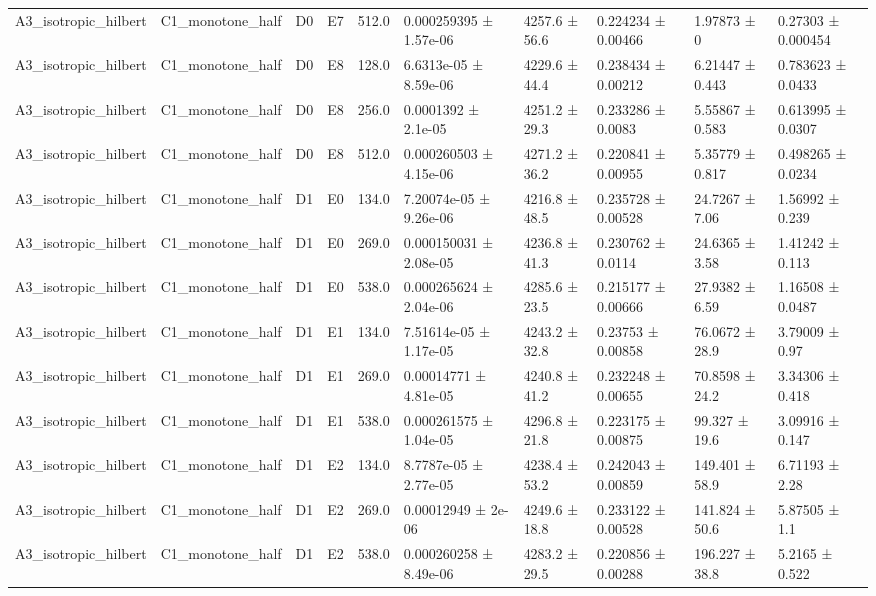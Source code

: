 \begin{table}
\begin{tabular}{llllllllll}
A3\_isotropic\_hilbert & C1\_monotone\_half & D0 & E7 & 512.0 & 0.000259395 ± 1.57e-06 & 4257.6 ± 56.6 & 0.224234 ± 0.00466 & 1.97873 ± 0 & 0.27303 ± 0.000454 \\
A3\_isotropic\_hilbert & C1\_monotone\_half & D0 & E8 & 128.0 & 6.6313e-05 ± 8.59e-06 & 4229.6 ± 44.4 & 0.238434 ± 0.00212 & 6.21447 ± 0.443 & 0.783623 ± 0.0433 \\
A3\_isotropic\_hilbert & C1\_monotone\_half & D0 & E8 & 256.0 & 0.0001392 ± 2.1e-05 & 4251.2 ± 29.3 & 0.233286 ± 0.0083 & 5.55867 ± 0.583 & 0.613995 ± 0.0307 \\
A3\_isotropic\_hilbert & C1\_monotone\_half & D0 & E8 & 512.0 & 0.000260503 ± 4.15e-06 & 4271.2 ± 36.2 & 0.220841 ± 0.00955 & 5.35779 ± 0.817 & 0.498265 ± 0.0234 \\
A3\_isotropic\_hilbert & C1\_monotone\_half & D1 & E0 & 134.0 & 7.20074e-05 ± 9.26e-06 & 4216.8 ± 48.5 & 0.235728 ± 0.00528 & 24.7267 ± 7.06 & 1.56992 ± 0.239 \\
A3\_isotropic\_hilbert & C1\_monotone\_half & D1 & E0 & 269.0 & 0.000150031 ± 2.08e-05 & 4236.8 ± 41.3 & 0.230762 ± 0.0114 & 24.6365 ± 3.58 & 1.41242 ± 0.113 \\
A3\_isotropic\_hilbert & C1\_monotone\_half & D1 & E0 & 538.0 & 0.000265624 ± 2.04e-06 & 4285.6 ± 23.5 & 0.215177 ± 0.00666 & 27.9382 ± 6.59 & 1.16508 ± 0.0487 \\
A3\_isotropic\_hilbert & C1\_monotone\_half & D1 & E1 & 134.0 & 7.51614e-05 ± 1.17e-05 & 4243.2 ± 32.8 & 0.23753 ± 0.00858 & 76.0672 ± 28.9 & 3.79009 ± 0.97 \\
A3\_isotropic\_hilbert & C1\_monotone\_half & D1 & E1 & 269.0 & 0.00014771 ± 4.81e-05 & 4240.8 ± 41.2 & 0.232248 ± 0.00655 & 70.8598 ± 24.2 & 3.34306 ± 0.418 \\
A3\_isotropic\_hilbert & C1\_monotone\_half & D1 & E1 & 538.0 & 0.000261575 ± 1.04e-05 & 4296.8 ± 21.8 & 0.223175 ± 0.00875 & 99.327 ± 19.6 & 3.09916 ± 0.147 \\
A3\_isotropic\_hilbert & C1\_monotone\_half & D1 & E2 & 134.0 & 8.7787e-05 ± 2.77e-05 & 4238.4 ± 53.2 & 0.242043 ± 0.00859 & 149.401 ± 58.9 & 6.71193 ± 2.28 \\
A3\_isotropic\_hilbert & C1\_monotone\_half & D1 & E2 & 269.0 & 0.00012949 ± 2e-06 & 4249.6 ± 18.8 & 0.233122 ± 0.00528 & 141.824 ± 50.6 & 5.87505 ± 1.1 \\
A3\_isotropic\_hilbert & C1\_monotone\_half & D1 & E2 & 538.0 & 0.000260258 ± 8.49e-06 & 4283.2 ± 29.5 & 0.220856 ± 0.00288 & 196.227 ± 38.8 & 5.2165 ± 0.522 \\

\end{tabular}
\end{table}
